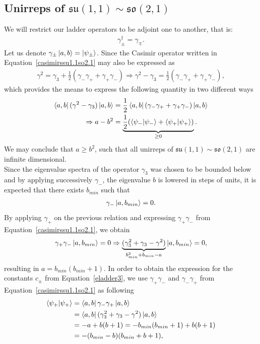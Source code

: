 \documentclass[12pt,a4paper]{report}
\theoremstyle{definition}
\theoremstyle{remark}
\theoremstyle{remark}
\begin{document}
\subsection{Unirreps of $\mathfrak{su}(1,1)\sim\mathfrak{so}(2,1)$}
We will restrict our ladder operators to be adjoint one to another, that is:
\begin{align*}
\gamma_\pm^{\dagger}=\gamma_\mp.
\end{align*}
Let us denote $\gamma_\pm\ket{a,b}=\ket{\psi_\pm}$. Since the Casimir operator written in Equation~\ref{casimirssu1.1so2.1} may also be expressed as
\begin{align*}
\gamma^2=\gamma_3+\frac{1}{2}(\gamma_-\gamma_++\gamma_+\gamma_-)\Rightarrow\gamma^2-\gamma_3=\frac{1}{2}(\gamma_-\gamma_++\gamma_+\gamma_-),
\end{align*}
which provides the means to express the following quantity in two different ways
\begin{align*}
\bra{a,b}(\gamma^2-\gamma_3)\ket{a,b}&=\frac{1}{2}\bra{a,b}(\gamma_-\gamma_++\gamma_+\gamma_-)\ket{a,b} \\
\Rightarrow a-b^2&=\underbrace{\frac{1}{2}(\braket{\psi_-|\psi_-}+\braket{\psi_+|\psi_+})}_{\geq 0}.
\end{align*}
We may conclude that $a\geq b^2$, such that all unirreps of $\mathfrak{su}(1,1)\sim\mathfrak{so}(2,1)$ are infinite dimensional. \\ \indent
Since the eigenvalue spectra of the operator $\gamma_3$ was chosen to be bounded below and by applying successively  $\gamma_-$, the eigenvalue $b$ is lowered in steps of units, it is expected that there exists $b_{min}$ such that
\begin{align*}
\gamma_-\ket{a,b_{min}}=0.
\end{align*} 
By applying $\gamma_+$ on the previous relation and expressing $\gamma_+\gamma_-$ from Equation~\ref{casimirssu1.1so2.1}, we obtain
\begin{align*}
\gamma_+\gamma_-\ket{a,b_{min}}=0\Rightarrow \underbrace{(\gamma_3^2+\gamma_3-\gamma^2)}_{b_{min}^2+b_{min}-a}\ket{a,b_{min}}=0,
\end{align*} 
resulting in $a=b_{min}(b_{min}+1)$. In order to obtain the expression for the constants $c_\pm$ from Equation~\ref{eladder3}, we use $\gamma_+\gamma_-$ and $\gamma_-\gamma_+$ from Equation~\ref{casimirssu1.1so2.1} as following
\begin{align*}
\braket{\psi_+|\psi_+}&=\bra{a,b}\gamma_-\gamma_+\ket{a,b}\\
&=\bra{a,b}(\gamma_3^2+\gamma_3-\gamma^2)\ket{a,b} \\
&=-a+b(b+1)=-b_{min}(b_{min}+1)+b(b+1)\\
&=-(b_{min}-b)(b_{min}+b+1),
\end{align*}
\end{document}
